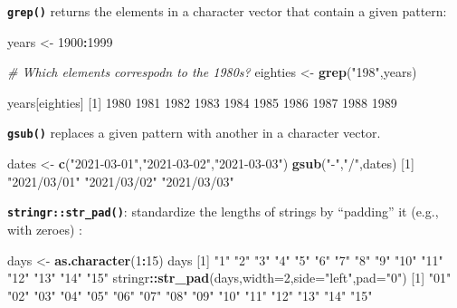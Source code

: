 \documentclass[
]{book}
\newenvironment{Shaded}{\begin{snugshade}}{\end{snugshade}}
\newcommand{\CommentTok}[1]{\textcolor[rgb]{0.56,0.35,0.01}{\textit{#1}}}
\newcommand{\DataTypeTok}[1]{\textcolor[rgb]{0.13,0.29,0.53}{#1}}
\newcommand{\DecValTok}[1]{\textcolor[rgb]{0.00,0.00,0.81}{#1}}
\newcommand{\KeywordTok}[1]{\textcolor[rgb]{0.13,0.29,0.53}{\textbf{#1}}}
\newcommand{\NormalTok}[1]{#1}
\newcommand{\OperatorTok}[1]{\textcolor[rgb]{0.81,0.36,0.00}{\textbf{#1}}}
\newcommand{\StringTok}[1]{\textcolor[rgb]{0.31,0.60,0.02}{#1}}
\begin{document}
\textbf{\texttt{grep()}} returns the elements in a character vector that contain a given pattern:

\begin{Shaded}
\begin{Highlighting}[]
\NormalTok{years <-}\StringTok{ }\DecValTok{1900}\OperatorTok{:}\DecValTok{1999}

\CommentTok{# Which elements correspodn to the 1980s?}
\NormalTok{eighties <-}\StringTok{ }\KeywordTok{grep}\NormalTok{(}\StringTok{"198"}\NormalTok{,years)}

\NormalTok{years[eighties]}
\NormalTok{ [}\DecValTok{1}\NormalTok{] }\DecValTok{1980} \DecValTok{1981} \DecValTok{1982} \DecValTok{1983} \DecValTok{1984} \DecValTok{1985} \DecValTok{1986} \DecValTok{1987} \DecValTok{1988} \DecValTok{1989}
\end{Highlighting}
\end{Shaded}

\textbf{\texttt{gsub()}} replaces a given pattern with another in a character vector.

\begin{Shaded}
\begin{Highlighting}[]
\NormalTok{dates <-}\StringTok{ }\KeywordTok{c}\NormalTok{(}\StringTok{"2021-03-01"}\NormalTok{,}\StringTok{"2021-03-02"}\NormalTok{,}\StringTok{"2021-03-03"}\NormalTok{)}
\KeywordTok{gsub}\NormalTok{(}\StringTok{"-"}\NormalTok{,}\StringTok{"/"}\NormalTok{,dates)}
\NormalTok{[}\DecValTok{1}\NormalTok{] }\StringTok{"2021/03/01"} \StringTok{"2021/03/02"} \StringTok{"2021/03/03"}
\end{Highlighting}
\end{Shaded}

\textbf{\texttt{stringr::str\_pad()}}: standardize the lengths of strings by ``padding'' it (e.g., with zeroes) :

\begin{Shaded}
\begin{Highlighting}[]
\NormalTok{days <-}\StringTok{ }\KeywordTok{as.character}\NormalTok{(}\DecValTok{1}\OperatorTok{:}\DecValTok{15}\NormalTok{)}
\NormalTok{days}
\NormalTok{ [}\DecValTok{1}\NormalTok{] }\StringTok{"1"}  \StringTok{"2"}  \StringTok{"3"}  \StringTok{"4"}  \StringTok{"5"}  \StringTok{"6"}  \StringTok{"7"}  \StringTok{"8"}  \StringTok{"9"}  \StringTok{"10"} \StringTok{"11"} \StringTok{"12"} \StringTok{"13"} \StringTok{"14"} \StringTok{"15"}
\NormalTok{stringr}\OperatorTok{::}\KeywordTok{str_pad}\NormalTok{(days,}\DataTypeTok{width=}\DecValTok{2}\NormalTok{,}\DataTypeTok{side=}\StringTok{"left"}\NormalTok{,}\DataTypeTok{pad=}\StringTok{"0"}\NormalTok{)}
\NormalTok{ [}\DecValTok{1}\NormalTok{] }\StringTok{"01"} \StringTok{"02"} \StringTok{"03"} \StringTok{"04"} \StringTok{"05"} \StringTok{"06"} \StringTok{"07"} \StringTok{"08"} \StringTok{"09"} \StringTok{"10"} \StringTok{"11"} \StringTok{"12"} \StringTok{"13"} \StringTok{"14"} \StringTok{"15"}
\end{Highlighting}
\end{Shaded}
\end{document}
